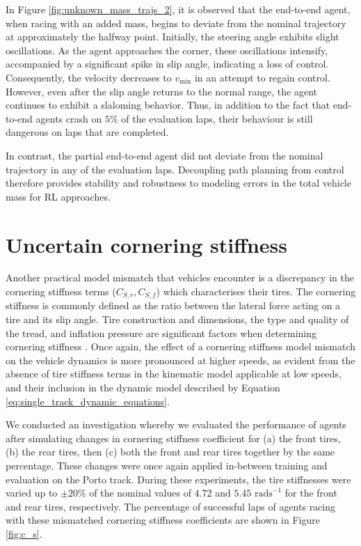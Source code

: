 In Figure \ref{fig:unknown_mass_trajs_2}, it is observed that the end-to-end agent, when racing with an added mass, begins to deviate from the nominal trajectory at approximately the halfway point. 
Initially, the steering angle exhibits slight oscillations. 
As the agent approaches the corner, these oscillations intensify, accompanied by a significant spike in slip angle, indicating a loss of control. 
Consequently, the velocity decreases to $v_{\text{min}}$ in an attempt to regain control. 
However, even after the slip angle returns to the normal range, the agent continues to exhibit a slaloming behavior.
Thus, in addition to the fact that end-to-end agents crash on $5\%$ of the evaluation laps, their behaviour is still dangerous on laps that are completed.

In contrast, the partial end-to-end agent did not deviate from the nominal trajectory in any of the evaluation laps.
Decoupling path planning from control therefore provides stability and robustness to modeling errors in the total vehicle mass for RL approaches.


\section{Uncertain cornering stiffness}

Another practical model mismatch that vehicles encounter is a discrepancy in the cornering stiffness terms ($C_{S,r}, C_{S,f}$) which characterises their tires.
The cornering stiffness is commonly defined as the ratio between the lateral force acting on a tire and its slip angle. 
Tire construction and dimensions, the type and quality of the tread, and inflation pressure are significant factors when determining cornering stiffness \cite{Vorotovic2013}.
Once again, the effect of a cornering stiffness model mismatch on the vehicle dynamics is more pronounced at higher speeds, as evident from the absence of tire stiffness terms in the kinematic model applicable at low speeds, and their inclusion in the dynamic model described by Equation \ref{eq:single_track_dynamic_equations}.


We conducted an investigation whereby we evaluated the performance of agents after simulating changes in cornering stiffness coefficient for (a) the front tires, (b) the rear tires, then (c) both the front and rear tires together by the same percentage.
These changes were once again applied in-between training and evaluation on the Porto track.
During these experiments, the tire stiffnesses were varied up to $\pm 20 \%$ of the nominal values of $4.72$ and $5.45$ $\text{rads}^{-1}$ for the front and rear tires, respectively.
The percentage of successful laps of agents racing with these mismatched cornering stiffness coefficients are shown in Figure \ref{fig:c_s}.

